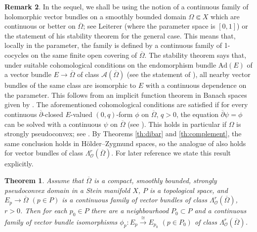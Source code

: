 \documentclass[11pt]{amsart}
\numberwithin{equation}{section}
\newtheorem{theorem}{Theorem}[section]
\theoremstyle{definition}
\newtheorem{remark}[theorem]{Remark}
\newcommand\Ascr{\mathscr{A}}
\newcommand\Oscr{\mathscr{O}}
\newcommand\dibar{\overline\partial}
\begin{document}
%
%
\begin{remark}\label{rem:stability}
In the sequel, we shall be using the notion of a continuous family 
of holomorphic vector bundles on a smoothly bounded domain 
$\Omega\Subset X$ which are continuous or better on $\overline\Omega$;
see Leiterer \cite[Definition 2.14, p.\ 70]{Leiterer1990} (where
the parameter space is $[0,1]$) or the statement of his stability 
theorem \cite[Theorem 2.7]{Leiterer1990} for the general case.
This means that, locally in the parameter, the family is defined
by a continuous family of 1-cocycles on the same finite open covering
of $\overline\Omega$. The stability theorem says that, 
under suitable cohomological conditions on the endomorphism bundle 
$\mathrm{Ad}(E)$ of a vector bundle $E\to \overline\Omega$ of class 
$\Ascr(\overline\Omega)$ (see the statement of 
\cite[Theorem 2.7]{Leiterer1990}), all nearby vector bundles of the same
class are isomorphic to $E$ with a continuous dependence on the
parameter. This follows from an implicit function theorem
in Banach spaces given by \cite[Theorem 2.9]{Leiterer1990}.
The aforementioned cohomological conditions 
are satisfied if for every continuous $\dibar$-closed 
$E$-valued $(0,q)$-form $\phi$ on $\overline\Omega$,
$q>0$, the equation $\dibar \psi=\phi$ can be solved with a continuous
$\psi$ on $\overline\Omega$ (see \cite[proof of Theorem 2.12]{Leiterer1990}). 
This holds in particular if $\Omega$ is strongly pseudoconvex; 
see \cite[Lemma 2.13]{Leiterer1990}. By Theorems \ref{th:dibar}
and \ref{th:complement}, the same conclusion holds in 
H\"older--Zygmund spaces, so the analogue of 
\cite[Theorem 2.7]{Leiterer1990} also holds for vector bundles
of class $\Lambda^r_\Oscr(\overline\Omega)$. 
For later reference we state this result explicitly.

\begin{theorem}\label{th:stability}
Assume that $\overline \Omega$ is a compact, smoothly bounded, 
strongly pseudoconvex domain in a Stein manifold $X$,  
$P$ is a topological space, and $E_p\to \overline \Omega$ $(p\in P)$ 
is a continuous family of vector bundles of class 
$\Lambda^r_\Oscr(\overline\Omega)$, $r>0$. 
Then for each $p_0\in P$ there are a neighbourhood $P_0\subset P$
and a continuous family of vector bundle isomorphisms
$\phi_p:E_p \stackrel{\cong}{\longrightarrow} E_{p_0}$ $(p\in P_0)$ 
of class $\Lambda^r_\Oscr(\overline\Omega)$. 
\end{theorem}
\end{remark}
\end{document}
